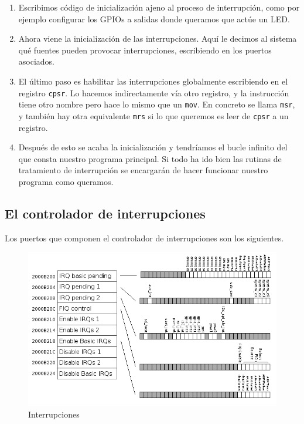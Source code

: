 \begin{enumerate}
  \item Escribimos código de inicialización ajeno al proceso de interrupción, como por ejemplo
        configurar los GPIOs a salidas donde queramos que actúe un LED.
  \item Ahora viene la inicialización de las interrupciones. Aquí le decimos al sistema qué fuentes
        pueden provocar interrupciones, escribiendo en los puertos asociados. 
  \item El último paso es habilitar las interrupciones globalmente escribiendo en el registro
        {\tt cpsr}. Lo hacemos indirectamente vía otro registro, y la instrucción tiene otro
        nombre pero hace lo mismo que un {\tt mov}. En concreto se llama {\tt msr}, y también hay
        otra equivalente {\tt mrs} si lo que queremos es leer de {\tt cpsr} a un registro.
  \item Después de esto se acaba la inicialización y tendríamos el bucle infinito del que consta
        nuestro programa principal. Si todo ha ido bien las rutinas de tratamiento de interrupción
        se encargarán de hacer funcionar nuestro programa como queramos.
\end{enumerate}

\subsection{El controlador de interrupciones}

Los puertos que componen el controlador de interrupciones son los siguientes.

\begin{figure}[h]
  \centering
    \includegraphics[width=14cm]{graphs/interrupciones.png}
  \caption{Interrupciones}
  \label{fig:interrupciones}
\end{figure}

